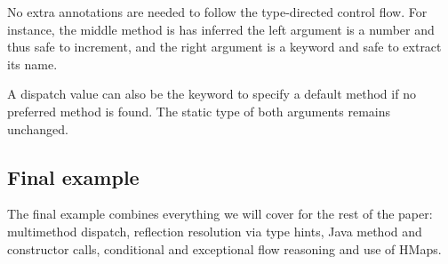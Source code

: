\inputminted[firstline=6,lastline=23]{clojure}{code/demo/src/demo/eg7.clj}

No extra annotations are needed to follow the type-directed control flow.
For instance, the middle method is has inferred the left argument is a number
and thus safe to increment, and the right argument is a keyword and safe to
extract its name.

A dispatch value can also be the keyword  to specify a default
method if no preferred method is found. The static type of both arguments
remains unchanged.

\subsection{Final example}

The final example combines everything we will cover for the rest of the paper:
multimethod dispatch, reflection resolution via type hints, Java method
and constructor calls, conditional and exceptional flow reasoning
and use of HMaps.

\inputminted[firstline=6,lastline=20]{clojure}{code/demo/src/demo/eg8.clj}









